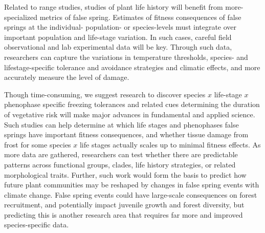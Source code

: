 \documentclass{article}\usepackage[]{graphicx}\usepackage[]{color}
\begin{document}
Related to range studies, studies of plant life history will benefit from more-specialized metrics of false spring. Estimates of fitness consequences of false springs at the individual- population- or species-levels must integrate over important population and life-stage variation. In such cases, careful field observational and lab experimental data will be key. Through such data, researchers can capture the variations in temperature thresholds, species- and lifestage-specific tolerance and avoidance strategies and climatic effects, and more accurately measure the level of damage.  

Though time-consuming, we suggest research to discover species \(x\) life-stage \(x\) phenophase specific freezing tolerances and related cues determining the duration of vegetative risk %
will make major advances in fundamental and applied science. Such studies can help determine at which life stages and phenophases false springs have important fitness consequences, and whether tissue damage from frost for some species \(x\) life stages actually scales up to minimal fitness effects. As more data are gathered, researchers can test whether there are predictable patterns across functional groups, clades, life history strategies, or related morphological traits. Further, such work would form the basis to predict how future plant communities may be reshaped by changes in false spring events with climate change. False spring events could have large-scale consequences on forest recruitment, and potentially impact juvenile growth and forest diversity, but predicting this is another research area that requires far more and improved species-specific data. 
\end{document}
